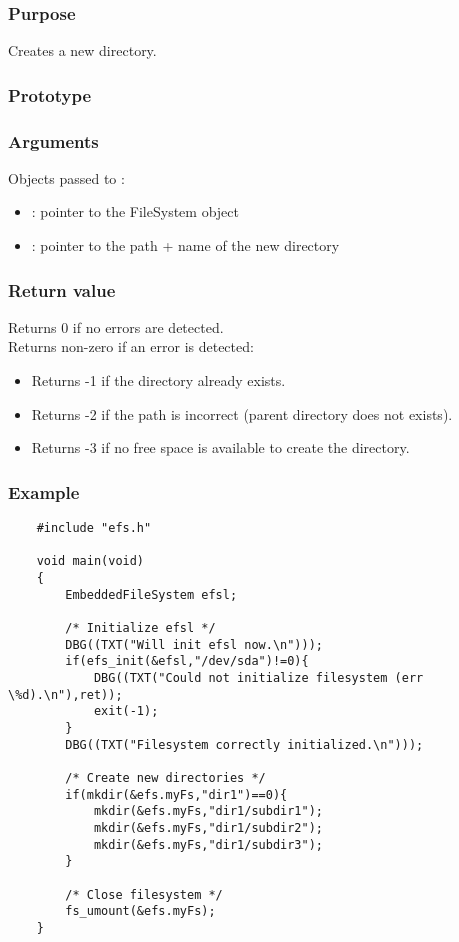 \subsubsection*{Purpose}
Creates a new directory.
\subsubsection*{Prototype}
\subsubsection*{Arguments}
Objects passed to :
\begin{itemize}
	\item{: pointer to the FileSystem object}
	\item{: pointer to the path + name of the new directory}
\end{itemize}
\subsubsection*{Return value}
Returns 0 if no errors are detected.\\
\newline
Returns non-zero if an error is detected:
\begin{itemize}
	\item{Returns -1 if the directory already exists.}
	\item{Returns -2 if the path is incorrect (parent directory does not exists).}
	\item{Returns -3 if no free space is available to create the directory.}
\end{itemize}
\subsubsection*{Example}
\lstset{numbers=left, stepnumber=1, numberstyle=\small, numbersep=5pt, tabsize=4}
\begin{lstlisting}
	#include "efs.h"

	void main(void)
	{
		EmbeddedFileSystem efsl;

		/* Initialize efsl */
		DBG((TXT("Will init efsl now.\n")));
		if(efs_init(&efsl,"/dev/sda")!=0){
			DBG((TXT("Could not initialize filesystem (err \%d).\n"),ret));
			exit(-1);
		}
		DBG((TXT("Filesystem correctly initialized.\n")));

		/* Create new directories */
		if(mkdir(&efs.myFs,"dir1")==0){
			mkdir(&efs.myFs,"dir1/subdir1");
			mkdir(&efs.myFs,"dir1/subdir2");
			mkdir(&efs.myFs,"dir1/subdir3");
		}

		/* Close filesystem */
		fs_umount(&efs.myFs);
	}
\end{lstlisting}
